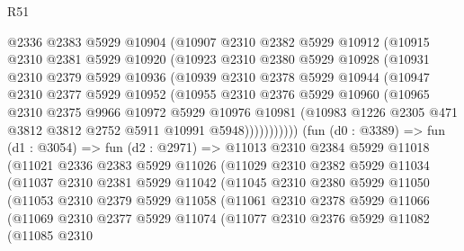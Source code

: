 \begin{lexlean}{R51}
\begin{coremodule}
            @2336
            @2383
            @5929
            @10904
            (@10907
              @2310
              @2382
              @5929
              @10912
              (@10915
                @2310
                @2381
                @5929
                @10920
                (@10923
                  @2310
                  @2380
                  @5929
                  @10928
                  (@10931
                    @2310
                    @2379
                    @5929
                    @10936
                    (@10939
                      @2310
                      @2378
                      @5929
                      @10944
                      (@10947
                        @2310
                        @2377
                        @5929
                        @10952
                        (@10955
                          @2310
                          @2376
                          @5929
                          @10960
                          (@10965
                            @2310
                            @2375
                            @9966
                            @10972
                            @5929
                            @10976
                            @10981
                            (@10983 @1226 @2305 @471 @3812 @3812 @2752 @5911 @10991 @5948)))))))))))
        (fun (d0 : @3389) =>
        fun (d1 : @3054) =>
        fun (d2 : @2971) =>
        @11013
          @2310
          @2384
          @5929
          @11018
          (@11021
            @2336
            @2383
            @5929
            @11026
            (@11029
              @2310
              @2382
              @5929
              @11034
              (@11037
                @2310
                @2381
                @5929
                @11042
                (@11045
                  @2310
                  @2380
                  @5929
                  @11050
                  (@11053
                    @2310
                    @2379
                    @5929
                    @11058
                    (@11061
                      @2310
                      @2378
                      @5929
                      @11066
                      (@11069
                        @2310
                        @2377
                        @5929
                        @11074
                        (@11077
                          @2310
                          @2376
                          @5929
                          @11082
                          (@11085
                            @2310

\end{coremodule}
\end{lexlean}
